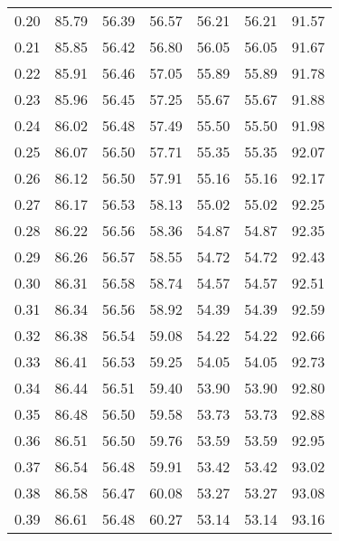 \begin{tabular}{|c|c|c|c|c|c|c|}
      0.20 &     85.79 &     56.39 &      56.57 &   56.21 &      56.21 &         91.57 \\
      0.21 &     85.85 &     56.42 &      56.80 &   56.05 &      56.05 &         91.67 \\
      0.22 &     85.91 &     56.46 &      57.05 &   55.89 &      55.89 &         91.78 \\
      0.23 &     85.96 &     56.45 &      57.25 &   55.67 &      55.67 &         91.88 \\
      0.24 &     86.02 &     56.48 &      57.49 &   55.50 &      55.50 &         91.98 \\
      0.25 &     86.07 &     56.50 &      57.71 &   55.35 &      55.35 &         92.07 \\
      0.26 &     86.12 &     56.50 &      57.91 &   55.16 &      55.16 &         92.17 \\
      0.27 &     86.17 &     56.53 &      58.13 &   55.02 &      55.02 &         92.25 \\
      0.28 &     86.22 &     56.56 &      58.36 &   54.87 &      54.87 &         92.35 \\
      0.29 &     86.26 &     56.57 &      58.55 &   54.72 &      54.72 &         92.43 \\
      0.30 &     86.31 &     56.58 &      58.74 &   54.57 &      54.57 &         92.51 \\
      0.31 &     86.34 &     56.56 &      58.92 &   54.39 &      54.39 &         92.59 \\
      0.32 &     86.38 &     56.54 &      59.08 &   54.22 &      54.22 &         92.66 \\
      0.33 &     86.41 &     56.53 &      59.25 &   54.05 &      54.05 &         92.73 \\
      0.34 &     86.44 &     56.51 &      59.40 &   53.90 &      53.90 &         92.80 \\
      0.35 &     86.48 &     56.50 &      59.58 &   53.73 &      53.73 &         92.88 \\
      0.36 &     86.51 &     56.50 &      59.76 &   53.59 &      53.59 &         92.95 \\
      0.37 &     86.54 &     56.48 &      59.91 &   53.42 &      53.42 &         93.02 \\
      0.38 &     86.58 &     56.47 &      60.08 &   53.27 &      53.27 &         93.08 \\
      0.39 &     86.61 &     56.48 &      60.27 &   53.14 &      53.14 &         93.16 \\

\end{tabular}
